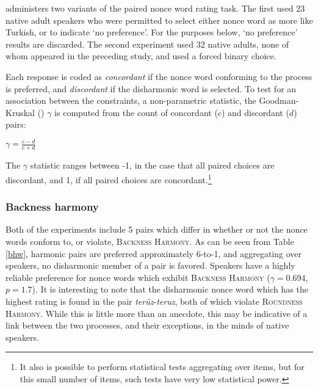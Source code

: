 \citet{Zimmer1969} administers two variants of the paired nonce word rating task. The first used 23 native adult speakers who were permitted to select either nonce word as more like Turkish, or to indicate `no preference'. For the purposes below, `no preference' results are discarded. The second experiment used 32 native adults, none of whom appeared in the preceding study, and used a forced binary choice.

Each response is coded as \emph{concordant} if the nonce word conforming to the process is preferred, and \emph{discordant} if the disharmonic word is selected. To test for an association between the constraints, a non-parametric statistic, the Goodman-Kruskal (\citeyear{Goodman1954}) $\gamma$ is computed from the count of concordant ($c$) and discordant ($d$) pairs:

\begin{unlabeledexample}
$\displaystyle \gamma = \frac{c - d}{c + d}$
\end{unlabeledexample}

\noindent
The $\gamma$ statistic ranges between -1, in the case that all paired choices are discordant, and 1, if all paired choices are concordant.\footnote{It also is possible to perform statistical tests aggregating over items, but for this small number of items, such tests have very low statistical power.}

\subsubsection{Backness harmony}

Both of the \citet{Zimmer1969} experiments include 5 pairs which differ in whether or not the nonce words conform to, or violate, \textsc{Backness Harmony}. As can be seen from Table \ref{bhw}, harmonic pairs are preferred approximately 6-to-1, and aggregating over speakers, no disharmonic member of a pair is favored. Speakers have a highly reliable preference for nonce words which exhibit \textsc{Backness Harmony} ($\gamma = 0.694$, $p = 1.7$). It is interesting to note that the disharmonic nonce word which has the highest rating is found in the pair \emph{terüz}-\emph{teruz}, both of which violate \textsc{Roundness Harmony}. While this is little more than an anecdote, this may be  indicative of a link between the two processes, and their exceptions, in the minds of native speakers. 

